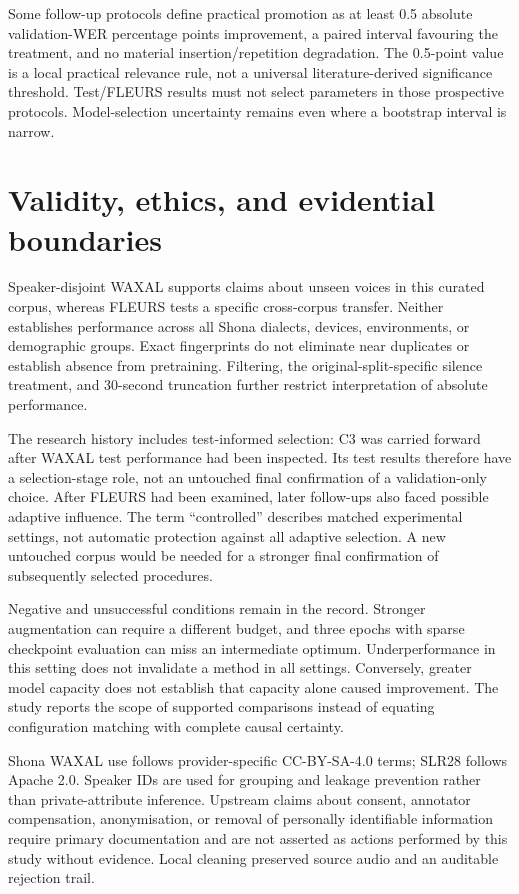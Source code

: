 \documentclass[12pt,a4paper]{report}
\begin{document}
Some follow-up protocols define practical promotion as at least 0.5 absolute validation-WER percentage points improvement, a paired interval favouring the treatment, and no material insertion/repetition degradation. The 0.5-point value is a local practical relevance rule, not a universal literature-derived significance threshold. Test/FLEURS results must not select parameters in those prospective protocols. Model-selection uncertainty remains even where a bootstrap interval is narrow.

\section{Validity, ethics, and evidential boundaries}
\label{sec:validity}

Speaker-disjoint WAXAL supports claims about unseen voices in this curated corpus, whereas FLEURS tests a specific cross-corpus transfer. Neither establishes performance across all Shona dialects, devices, environments, or demographic groups. Exact fingerprints do not eliminate near duplicates or establish absence from pretraining. Filtering, the original-split-specific silence treatment, and 30-second truncation further restrict interpretation of absolute performance.

The research history includes test-informed selection: C3 was carried forward after WAXAL test performance had been inspected. Its test results therefore have a selection-stage role, not an untouched final confirmation of a validation-only choice. After FLEURS had been examined, later follow-ups also faced possible adaptive influence. The term ``controlled'' describes matched experimental settings, not automatic protection against all adaptive selection. A new untouched corpus would be needed for a stronger final confirmation of subsequently selected procedures.

Negative and unsuccessful conditions remain in the record. Stronger augmentation can require a different budget, and three epochs with sparse checkpoint evaluation can miss an intermediate optimum. Underperformance in this setting does not invalidate a method in all settings. Conversely, greater model capacity does not establish that capacity alone caused improvement. The study reports the scope of supported comparisons instead of equating configuration matching with complete causal certainty.

Shona WAXAL use follows provider-specific CC-BY-SA-4.0 terms; SLR28 follows Apache 2.0. Speaker IDs are used for grouping and leakage prevention rather than private-attribute inference. Upstream claims about consent, annotator compensation, anonymisation, or removal of personally identifiable information require primary documentation and are not asserted as actions performed by this study without evidence. Local cleaning preserved source audio and an auditable rejection trail.
\end{document}
